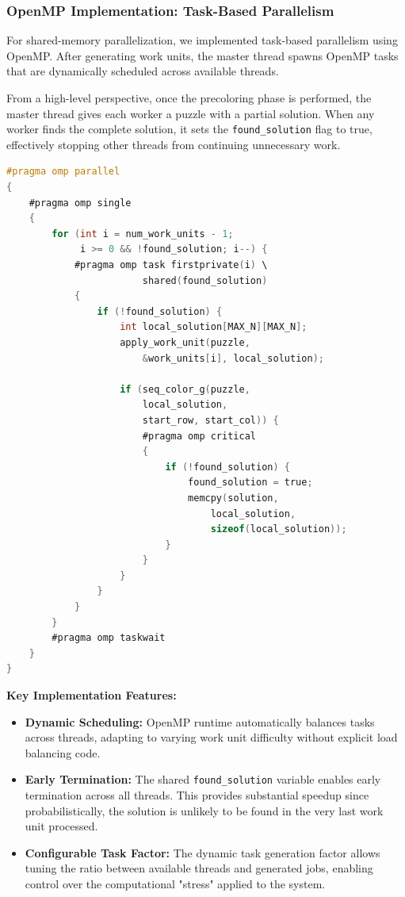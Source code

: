 \subsubsection{OpenMP Implementation: Task-Based Parallelism}
\label{subsubsec:omp_implementation}
For shared-memory parallelization, we implemented task-based parallelism using OpenMP. After generating work units, the master thread spawns OpenMP tasks that are dynamically scheduled across available threads.

From a high-level perspective, once the precoloring phase is performed, the master thread gives each worker a puzzle with a partial solution. When any worker finds the complete solution, it sets the \texttt{found\_solution} flag to true, effectively stopping other threads from continuing unnecessary work.

\begin{lstlisting}[language=C, caption=OpenMP task-based implementation, label={listing:omp_implementation}]
#pragma omp parallel
{
    #pragma omp single
    {
        for (int i = num_work_units - 1; 
             i >= 0 && !found_solution; i--) {
            #pragma omp task firstprivate(i) \
                        shared(found_solution)
            {
                if (!found_solution) {
                    int local_solution[MAX_N][MAX_N];
                    apply_work_unit(puzzle, 
                        &work_units[i], local_solution);
                    
                    if (seq_color_g(puzzle, 
                        local_solution, 
                        start_row, start_col)) {
                        #pragma omp critical
                        {
                            if (!found_solution) {
                                found_solution = true;
                                memcpy(solution, 
                                    local_solution, 
                                    sizeof(local_solution));
                            }
                        }
                    }
                }
            }
        }
        #pragma omp taskwait
    }
}
\end{lstlisting}

\textbf{Key Implementation Features:}
\begin{itemize}
    \item \textbf{Dynamic Scheduling:} OpenMP runtime automatically balances tasks across threads, adapting to varying work unit difficulty without explicit load balancing code.
    \item \textbf{Early Termination:} The shared \texttt{found\_solution} variable enables early termination across all threads. This provides substantial speedup since probabilistically, the solution is unlikely to be found in the very last work unit processed.
    \item \textbf{Configurable Task Factor:} The dynamic task generation factor allows tuning the ratio between available threads and generated jobs, enabling control over the computational "stress" applied to the system.
\end{itemize}

